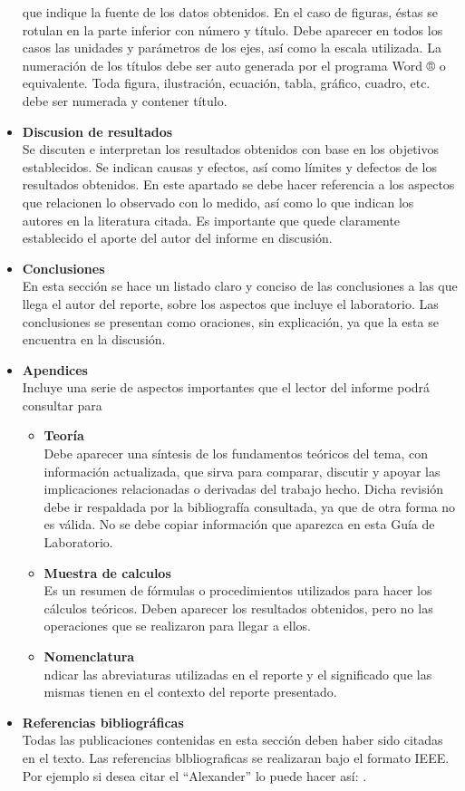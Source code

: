 \documentclass{report}
\begin{document}
\begin{itemize}
que indique la fuente de los datos obtenidos. En el caso de figuras, éstas se
rotulan en la parte inferior con número y título. Debe aparecer en todos los casos
las unidades y parámetros de los ejes, así como la escala utilizada.
La numeración de los títulos debe ser auto generada por el programa Word ® o
equivalente. Toda figura, ilustración, ecuación, tabla, gráfico, cuadro, etc. debe ser
numerada y contener título.
\item \textbf{Discusion de resultados}\\
Se discuten e interpretan los resultados obtenidos con base en los objetivos
establecidos. Se indican causas y efectos, así como límites y defectos de los
resultados obtenidos. En este apartado se debe hacer referencia a los aspectos
que relacionen lo observado con lo medido, así como lo que indican los autores en
la literatura citada. Es importante que quede claramente establecido el aporte del
autor del informe en discusión.
\item \textbf{Conclusiones}\\
En esta sección se hace un listado claro y conciso de las conclusiones a las que
llega el autor del reporte, sobre los aspectos que incluye el laboratorio. Las
conclusiones se presentan como oraciones, sin explicación, ya que la esta se
encuentra en la discusión.\\
\item \textbf{Apendices}\\
Incluye una serie de aspectos importantes que el lector del informe podrá
consultar para\begin{itemize}
\item \textbf{Teoría}\\
Debe aparecer una síntesis de los fundamentos teóricos del tema, con información
actualizada, que sirva para comparar, discutir y apoyar las implicaciones
relacionadas o derivadas del trabajo hecho. Dicha revisión debe ir respaldada por
la bibliografía consultada, ya que de otra forma no es válida. No se debe copiar
información que aparezca en esta Guía de Laboratorio.\\
\item \textbf{Muestra de calculos}\\
Es un resumen de fórmulas o procedimientos utilizados para hacer los cálculos
teóricos. Deben aparecer los resultados obtenidos, pero no las operaciones que se
realizaron para llegar a ellos.
\item \textbf{Nomenclatura}\\
ndicar las abreviaturas utilizadas en el reporte y el significado que las mismas
tienen en el contexto del reporte presentado.\\
\end{itemize} 
\item \textbf{Referencias bibliográficas}\\
Todas las publicaciones contenidas en esta sección deben haber sido citadas en
el texto. Las referencias blbliograficas se realizaran bajo el formato IEEE. Por ejemplo si desea citar el ``Alexander'' lo puede hacer así: \cite{alexander2006fundamentos}. 
\end{itemize}
\end{document}

